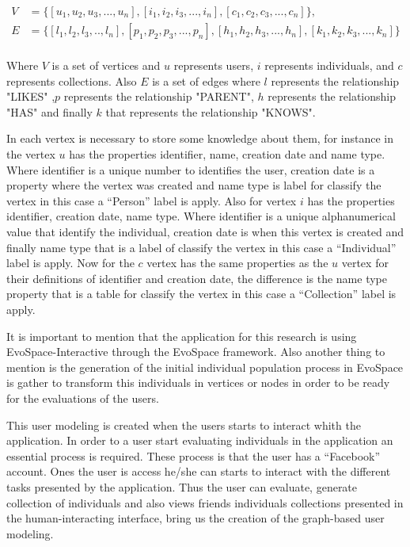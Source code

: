 \begin{equation*}\label{eq:graphRelDef} 
\displaystyle 
\begin{split} 
V &= \{[u_1,u_2,u_3,...,u_n],[i_1,i_2,i_3,...,i_n],[c_1,c_2,c_3,...,c_n]\},\\ 
E&= \{[l_1,l_2,l_3,..,l_n],[p_1,p_2,p_3,...,p_n],[h_1,h_2,h_3,...,h_n],[k_1,k_2,k_3,...,k_n]\}\\ 
\end{split} 
\end{equation*} 

Where $V$ is a set of vertices and $u$ represents users, $i$ represents
individuals, and $c$ represents collections. Also $E$ is a set of edges where
$l$ represents the relationship "LIKES" ,$p$ represents the relationship
"PARENT", $h$ represents the relationship "HAS" and finally $k$ that represents
the relationship "KNOWS".

In each vertex is necessary to store some knowledge about them, for instance in
the vertex $u$ has the properties identifier, name, creation date and name type.
Where identifier is a unique number to identifies the user, creation date is a
property where the vertex was created and name type is label for classify the
vertex in this case a “Person” label is apply. Also for vertex $i$ has the
properties identifier,  creation date, name type. Where identifier is a unique
alphanumerical value  that identify the individual, creation date is when this
vertex is created and finally name type that is a label of classify the vertex
in this case a “Individual” label is apply. Now for the  $c$ vertex has the same
properties as the $u$ vertex for their definitions of identifier and creation
date, the difference is the name type property that is a table for classify the
vertex in this case a “Collection” label is apply.

It is important to mention that the application for this research is using
EvoSpace-Interactive through the EvoSpace framework. Also another thing to
mention  is the generation of the initial individual population process in
EvoSpace is gather to transform this individuals in vertices or nodes in order
to  be ready for the evaluations of the users.
 
This user modeling is created when the users starts to interact whith the
application. In order to a user start evaluating individuals  in the application
an essential process is required. These process is that the user has a
“Facebook” account. Ones the user is access he/she can starts to interact with
the different tasks presented by the application. Thus the user can evaluate,
generate collection of individuals and also views friends individuals
collections presented in the human-interacting interface, bring us the creation
of the graph-based user modeling.


